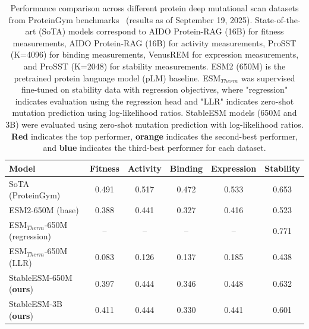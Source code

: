 \documentclass[]{fairmeta}
\begin{document}
\begin{table}[htbp]
\centering
\small
\begin{tabular}{l|c|c|c|c|c}
\toprule
\textbf{Model} & \textbf{Fitness} & \textbf{Activity} & \textbf{Binding} & \textbf{Expression} & \textbf{Stability} \\
\midrule
SoTA (ProteinGym) & \textcolor{red!80}{0.491}& \textcolor{red!80}{0.517} & \textcolor{red!80}{0.472} & \textcolor{red!80}{0.533} & \textcolor{orange!80}{0.653} \\
\midrule
ESM2-650M (base) & 0.388 & \textcolor{blue!80}{0.441} & 0.327 & 0.416 & 0.523 \\
\midrule
ESM$_{Therm}$-650M (regression) & -- & -- & -- & -- & \textcolor{red!80}{0.771} \\
\midrule
ESM$_{Therm}$-650M (LLR) & 0.083 & 0.126 & 0.137 & 0.185 & 0.438 \\
\midrule
    StableESM-650M (\textbf{ours}) & \textcolor{blue!80}{0.397} & \textcolor{orange!80}{0.444} & \textcolor{orange!80}{0.346} & \textcolor{orange!80}{0.448} & \textcolor{blue!80}{0.632} \\
\midrule
StableESM-3B (\textbf{ours}) & \textcolor{orange!80}{0.411} & \textcolor{orange!80}{0.444} & \textcolor{blue!80}{0.330} & \textcolor{blue!80}{0.441} & 0.601 \\
\bottomrule
\end{tabular}
\caption{Performance comparison across different protein deep mutational scan datasets from ProteinGym benchmarks~\cite{notin2023proteingym} (results as of September 19, 2025). State-of-the-art (SoTA) models correspond to AIDO Protein-RAG (16B) for fitness measurements, AIDO Protein-RAG (16B) for activity measurements, ProSST (K=4096) for binding measurements, VenusREM for expression measurements, and ProSST (K=2048) for stability measurements. ESM2 (650M) is the pretrained protein language model (pLM) baseline. ESM$_{Therm}$ was supervised fine-tuned on stability data with regression objectives, where "regression" indicates evaluation using the regression head and "LLR" indicates zero-shot mutation prediction using log-likelihood ratios. StableESM models (650M and 3B) were evaluated using zero-shot mutation prediction with log-likelihood ratios. \textcolor{red!80}{\textbf{Red}} indicates the top performer, \textcolor{orange!80}{\textbf{orange}} indicates the second-best performer, and \textcolor{blue!80}{\textbf{blue}} indicates the third-best performer for each dataset.}
\label{tab:performance}
\end{table}
\end{document}
